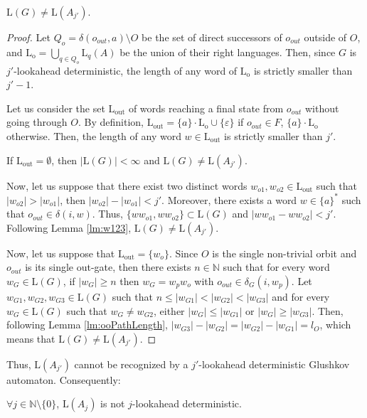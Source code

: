 \documentclass{llncs}
\begin{document}
\begin{proposition}
	$\mathrm{L}(G) \neq \mathrm{L}(A_{j'})$.
\end{proposition}
\begin{proof}
	Let $Q_o = \delta(o_{out}, a) \setminus O$ be the set of direct successors of $o_{out}$ outside of $O$, and $\mathrm{L_o} = \bigcup_{q \in Q_o} \mathrm{L}_q(A)$ be the union of their right languages.
	Then, since $G$ is $j'$-lookahead deterministic, the length of any word of $\mathrm{L_o}$ is strictly smaller than $j' - 1$.
	
	Let us consider the set $\mathrm{L_{out}}$ of words reaching a final state from $o_{out}$ without going through $O$.
	By definition, $\mathrm{L_{out}} = \{a\} \cdot \mathrm{L_o} \cup \{\varepsilon\}$ if $o_{out} \in F$, $\{a\} \cdot \mathrm{L_o}$ otherwise.
	Then, the length of any word $w \in \mathrm{L_{out}}$ is strictly smaller than $j'$.
	
	If $\mathrm{L_{out}} = \emptyset$, then $|\mathrm{L}(G)| < \infty$ and $\mathrm{L}(G) \neq \mathrm{L}(A_{j'})$.
	
	Now, let us suppose that there exist two distinct words $w_{o1}, w_{o2} \in \mathrm{L_{out}}$ such that $|w_{o2}| > |w_{o1}|$, then $|w_{o2}| - |w_{o1}| < j'$.
	Moreover, there exists a word $w \in \{a\}^*$ such that $o_{out} \in \delta(i, w)$.
	Thus, $\{ww_{o1}, ww_{o2}\} \subset \mathrm{L}(G)$ and $|ww_{o1} - ww_{o2}| < j'$.
	Following Lemma \ref{lm:w123}, $\mathrm{L}(G) \neq \mathrm{L}(A_{j'})$.
	
	Now, let us suppose that $\mathrm{L_{out}} = \{w_o\}$.
	Since $O$ is the single non-trivial orbit and $o_{out}$ is its single out-gate, then there exists $n \in \mathbb{N}$ such that for every word $w_G \in \mathrm{L}(G)$, if $|w_G| \geq n$ then $w_G = w_pw_o$ with $o_{out} \in \delta_G(i, w_p)$.
	Let $w_{G1}, w_{G2}, w_{G3} \in \mathrm{L}(G)$ such that $n \leq |w_{G1}| < |w_{G2}| < |w_{G3}|$ and for every $w_G \in\mathrm{L}(G)$ such that $w_G \neq w_{G2}$, either $|w_G| \leq |w_{G1}|$ or $|w_G| \geq |w_{G3}|$.
	Then, following Lemma \ref{lm:ooPathLength}, $|w_{G3}| - |w_{G2}| = |w_{G2}| - |w_{G1}| = l_O$, which means that $\mathrm{L}(G) \neq \mathrm{L}(A_{j'})$.
\end{proof}

	Thus, $\mathrm{L}(A_{j'})$ cannot be recognized by a $j'$-lookahead deterministic Glushkov automaton.
	Consequently:
	
\begin{proposition}\label{prop:Aj_non_j_ld}
	$\forall j \in \mathbb{N} \setminus \{0\}$, $\mathrm{L}(A_j)$ is not $j$-lookahead deterministic.
\end{proposition}
\end{document}
